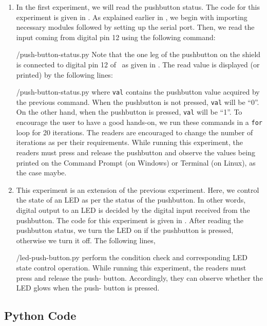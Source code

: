 \begin{enumerate}
\item In the first experiment, we will read the pushbutton status. The code for this experiment is given in
  . As explained earlier in , we begin with 
  importing necessary modules followed by setting up the serial port. 
  Then, we read the input coming from digital pin 12 using the
  following command:
  
  {\LocPushpycode/push-button-status.py} Note that the one leg of the pushbutton on
  the shield is connected to digital pin 12 of \arduino\, 
  as given in . The read value is displayed (or printed) 
 by the following lines: 
   
  {\LocPushpycode/push-button-status.py} where {\tt val} contains
  the pushbutton value acquired by the previous command. When the pushbutton is not pressed, {\tt val} will be ``0''. On the other hand,
  when the pushbutton is pressed, {\tt val} will be ``1''.
  To encourage the user to have a good hands-on, we run these commands in
  a {\tt for} loop for 20 iterations. The readers are encouraged to change the number 
  of iterations as per their requirements. While running this experiment, the readers must press
  and release the pushbutton and observe the values being printed on the
  Command Prompt (on Windows) or Terminal (on Linux), as the case maybe.


\item This experiment is an extension of the previous
  experiment. Here, we control the state of an LED as per the status
  of the pushbutton. In other words, digital output to an LED is
  decided by the digital input received from the pushbutton. The code
  for this experiment is given in . After reading
  the pushbutton status, we turn the LED on if the pushbutton is
  pressed, otherwise we turn it off. The following lines,
  
  {\LocPushpycode/led-push-button.py} perform the condition check
  and corresponding LED state control operation. While running this experiment, the readers must press and release the push-
  button. Accordingly, they can observe whether the LED glows when the push-
  button is pressed.
\end{enumerate}

\subsection{Python Code}
\lstset{style=mystyle}
\label{sec:push-python-code}

